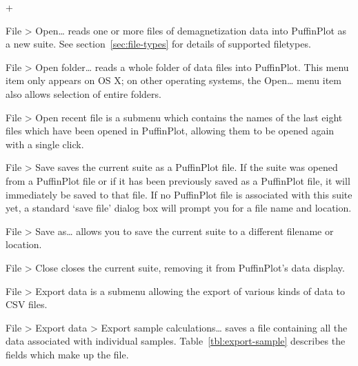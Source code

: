 \documentclass[a4paper,british]{article}
\newcommand{\menuitemlabel}[1]{%
\mbox{\textsf{#1}}\hfil}
\newenvironment{menuitemlist}%
{\begin{list}{}{%
\renewcommand{\makelabel}{\menuitemlabel}%
\setlength{\labelwidth}{35pt}%
\setlength{\leftmargin}%
             {\labelwidth+\labelsep}}}%
{\end{list}}
\newcommand{\ppcmd}[1]{\textsf{#1}} %
\newcommand{\caps}[1]{\MakeTextUppercase{#1}} %
\newcommand{\submenu}{ \textgreater{} } %
\begin{document}
\begin{menuitemlist}

\item[File\submenu Open\ldots] reads one or more files of demagnetization
  data into PuffinPlot as a new suite. See
  section~\ref{sec:file-types} for details of supported filetypes.

\item[File\submenu Open folder\ldots] reads a whole folder of data files
  into PuffinPlot. This menu item only appears on OS X; on other
  operating systems, the \ppcmd{Open\ldots} menu item also allows
  selection of entire folders.

\item[File\submenu Open recent file] is a submenu which contains the names of
  the last eight files which have been opened in PuffinPlot, allowing them to
  be opened again with a single click.

\item[File\submenu Save] saves the current suite as a PuffinPlot file. If
the suite was opened from a PuffinPlot file or if it has been previously
saved as a PuffinPlot file, it will immediately be saved to that file. If no %
PuffinPlot file is associated with this suite yet, a standard ‘save file’
dialog box will prompt you for a file name and location.

\item[File\submenu Save as\ldots] allows you to save the current suite to a
different filename or location.

\item[File\submenu Close] closes the current suite, removing it from
PuffinPlot's data display.

\item[File\submenu Export data] is a submenu allowing the export of
various kinds of data to \caps{csv} files.

\item[File\submenu Export data\submenu Export sample calculations\ldots]
  saves a file containing all the data associated with individual samples.
  Table~\ref{tbl:export-sample} describes the fields which make up the file.


\end{menuitemlist}
\end{document}
